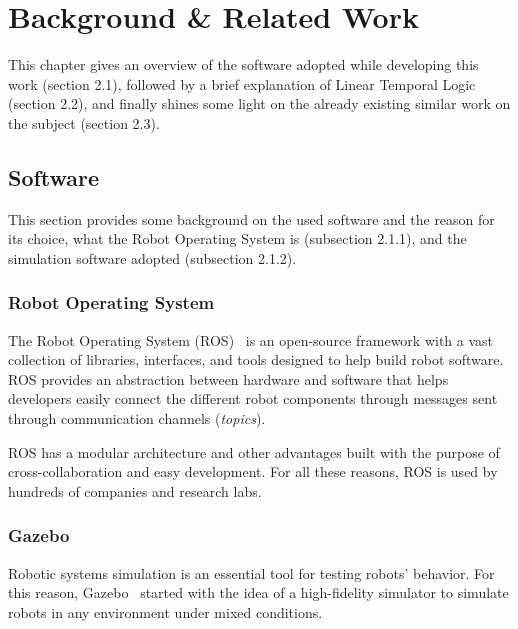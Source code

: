 \chapter{Background \& Related Work}
\label{chap:background}

This chapter gives an overview of the software adopted while developing this work (section 2.1), followed by a brief explanation of Linear Temporal Logic (section 2.2), and finally shines some light on the already existing similar work on the subject (section 2.3).

\section{Software}

This section provides some background on the used software and the reason for its choice, what the Robot Operating System is (subsection 2.1.1), and the simulation software adopted (subsection 2.1.2).

\subsection{Robot Operating System}
\label{sec:ros}

The Robot Operating System (ROS)~\cite{quigley2009ros} is an open-source framework with a vast collection of libraries, interfaces, and tools designed to help build robot software. ROS provides an abstraction between hardware and software that helps developers easily connect the different robot components through messages sent through communication channels (\textit{topics}).

ROS has a modular architecture and other advantages built with the purpose of cross-collaboration and easy development. For all these reasons, ROS is used by hundreds of companies and research labs.

\subsection{Gazebo}
\label{sec:gazebo}

Robotic systems simulation is an essential tool for testing robots' behavior. For this reason, Gazebo~\cite{koenig2004design} started with the idea of a high-fidelity simulator to simulate robots in any environment under mixed conditions.

